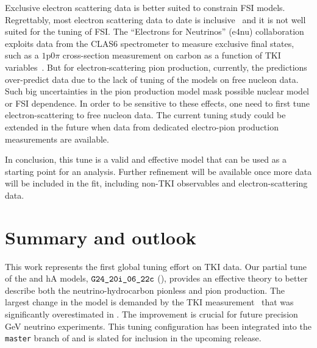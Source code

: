 Exclusive electron scattering data is better suited to constrain FSI models.
Regrettably, most electron scattering data to date is inclusive~\cite{electronsforneutrinos:2020tbf} and it is not well suited for the tuning of FSI. 
The ``Electrons for Neutrinos'' (e4nu) collaboration exploits data from the CLAS6 spectrometer to measure exclusive final states, such as a $1\textrm{p}0\pi$ cross-section measurement on carbon as a function of TKI variables~\cite{CLAS:2021neh}. But for electron-scattering pion production, 
currently, the \genie predictions over-predict data due to the lack of tuning of the \genie models on free nucleon data.
Such big uncertainties in the pion production model mask possible nuclear model or FSI dependence.
In order to be sensitive to these effects, one need to first tune electron-scattering to free nucleon data. The current tuning study could be extended in the future when data from dedicated electro-pion production measurements are available. 

In conclusion, this tune is a valid and effective model that can be used as a starting point for an analysis. 
Further refinement will be available once more data will be included in the fit, including non-TKI observables and electron-scattering data.


\section{\label{sec:summary} Summary and outlook}
This work represents the first global tuning effort on TKI data. Our partial tune of the \sfcfg and hA models, $\texttt{G24\_20i\_06\_22c}$ (\gC), provides an effective theory to better describe both the neutrino-hydrocarbon pionless and pion production.
The largest change in the model is demanded by the \minpiz TKI measurement~\cite{MINERvA:2020anu} that was significantly overestimated in \genie. 
The improvement is crucial for future precision GeV neutrino experiments.  This tuning configuration has been integrated into the \texttt{master} branch of \genie and is slated for inclusion in the upcoming release.  

